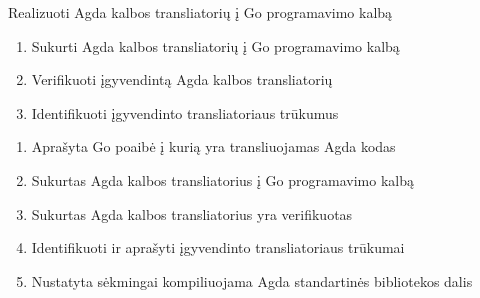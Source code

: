 \documentclass{VUMIFPSkursinis}
\begin{document}
Realizuoti Agda kalbos transliatorių į Go programavimo kalbą
\begin{enumerate}
\item Sukurti Agda kalbos transliatorių į Go programavimo kalbą
\item Verifikuoti įgyvendintą Agda kalbos transliatorių
\item Identifikuoti įgyvendinto transliatoriaus trūkumus 
\end{enumerate}
\begin{enumerate}
\item Aprašyta Go poaibė į kurią yra transliuojamas Agda kodas
\item Sukurtas Agda kalbos transliatorius į Go programavimo kalbą
\item Sukurtas Agda kalbos transliatorius yra verifikuotas
\item Identifikuoti ir aprašyti įgyvendinto transliatoriaus trūkumai
\item Nustatyta sėkmingai kompiliuojama Agda standartinės bibliotekos dalis
\end{enumerate}
\nocite{*}
\printbibliography[heading=bibintoc]
\end{document}
